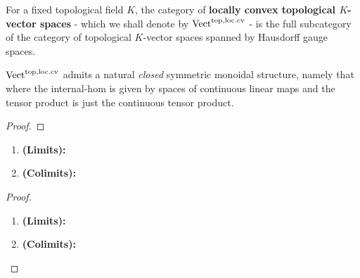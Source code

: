                 \begin{definition} \label{def: locally_convex_topological_vector_spaces}
                    For a fixed topological field $K$, the category of \textbf{locally convex topological $K$-vector spaces} - which we shall denote by $\mathrm{Vect}^{\mathrm{top}, \mathrm{loc}.\mathrm{cv}}$ - is the full subcategory of the category of topological $K$-vector spaces spanned by Hausdorff gauge spaces. 
                \end{definition}
                \begin{proposition} \label{prop: tensor_products_of_locally_convex_topological_vector_spaces}
                    $\mathrm{Vect}^{\mathrm{top}, \mathrm{loc}.\mathrm{cv}}$ admits a natural \textit{closed} symmetric monoidal structure, namely that where the internal-hom is given by spaces of continuous linear maps and the tensor product is just the continuous tensor product.  
                \end{proposition}
                    \begin{proof}
                                
                    \end{proof}
                \begin{proposition} \label{prop: (co)limits_of_locally_convex_topological_vector_spaces}
                    \noindent
                    \begin{enumerate}
                        \item \textbf{(Limits):}
                        \item \textbf{(Colimits):}
                    \end{enumerate}
                \end{proposition}
                    \begin{proof}
                        \noindent
                        \begin{enumerate}
                            \item \textbf{(Limits):}
                            \item \textbf{(Colimits):}
                        \end{enumerate}
                    \end{proof}
                
